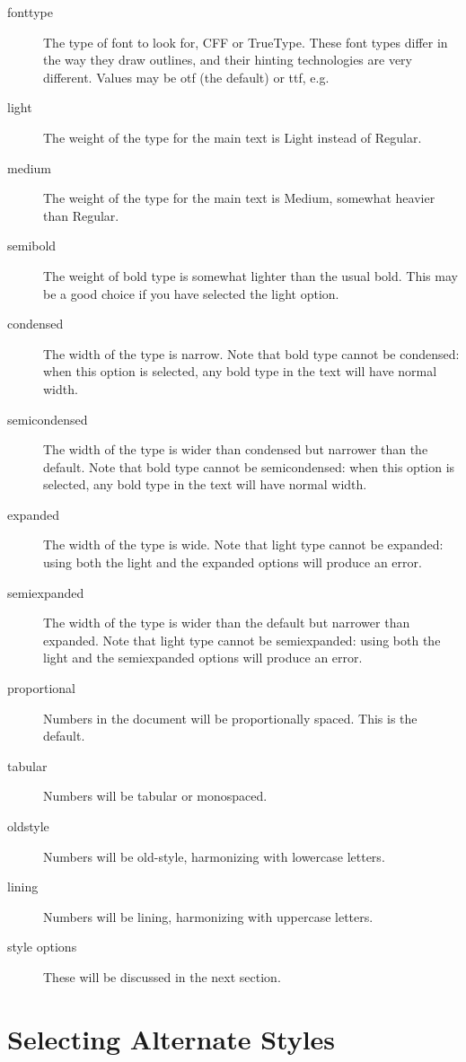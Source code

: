 \documentclass{article}
\begin{document}
\begin{description}
\item[fonttype] The type of font to look for, CFF or TrueType. These font types differ in the
way they draw outlines, and their hinting technologies are very different. Values may be otf
(the default) or ttf, e.g.\\
\hspace*{1in}{\verb|\usepackage[fonttype=ttf]{Junicode}|}
\item[light] The weight of the type for the main text is Light instead of Regular.
\item[medium] The weight of the type for the main text is Medium, somewhat heavier than Regular.
\item[semibold] The weight of bold type is somewhat lighter than the usual bold. This may be a
good choice if you have selected the light option.
\item[condensed] The width of the type is narrow. Note that bold type cannot be condensed: when
this option is selected, any bold type in the text will have normal width.
\item[semicondensed] The width of the type is wider than condensed but narrower than the default.
Note that bold type cannot be semicondensed: when this option is selected, any bold type in the
text will have normal width.
\item[expanded] The width of the type is wide. Note that light type cannot be expanded: using
both the light and the expanded options will produce an error.
\item[semiexpanded] The width of the type is wider than the default but narrower than expanded.
Note that light type cannot be semiexpanded: using both the light and the semiexpanded options
will produce an error.
\item[proportional] Numbers in the document will be proportionally spaced. This is the default.
\item[tabular] Numbers will be tabular or monospaced.
\item[oldstyle] Numbers will be old-style, harmonizing with lowercase letters.
\item[lining] Numbers will be lining, harmonizing with uppercase letters.
\item[style options] These will be discussed in the next section.
\end{description}

\section{Selecting Alternate Styles}
\end{document}
